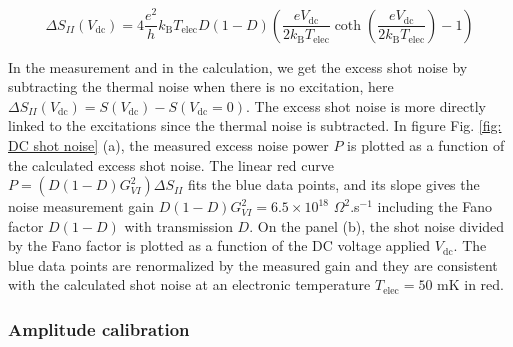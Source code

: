 \begin{equation}
\Delta S_{II}\left(V_{\mathrm{dc}}\right) = 4\frac{e^{2}}{h}k_{\mathrm{B}}T_{\mathrm{elec}}D(1-D)\left(\frac{eV_{\mathrm{dc}}}{2k_{\mathrm{B}}T_{\mathrm{elec}}}\coth\left(\frac{eV_{\mathrm{dc}}}{2k_{\mathrm{B}}T_{\mathrm{elec}}}\right)-1\right) \label{eq: DC excess shot noise}
\end{equation}

In the measurement and in the calculation, we get the excess shot noise by subtracting the thermal noise when there is no excitation, here $\Delta S_{II}\left(V_{\mathrm{dc}}\right) = S\left(V_{\mathrm{dc}}\right)-S\left(V_{\mathrm{dc}}=0\right)$.
The excess shot noise is more directly linked to the excitations since the thermal noise is subtracted.
In figure Fig. \ref{fig: DC shot noise} (a), the measured excess noise power $P$ is plotted as a function of the calculated excess shot noise.
The linear red curve $P = \left(D\left(1-D\right)G^{2}_{VI}\right) \Delta S_{II}$ fits the blue data points, and its slope gives the noise measurement gain $D\left(1-D\right)G^{2}_{VI} = 6.5\times 10^{18}$ $\Omega^{2}$.s$^{-1}$ including the Fano factor $D(1-D)$ with transmission $D$.
On the panel (b), the shot noise divided by the Fano factor is plotted as a function of the DC voltage applied $V_{\mathrm{dc}}$.
The blue data points are renormalized by the measured gain and they are consistent with the calculated shot noise at an electronic temperature $T_{\mathrm{elec}} = 50$ mK in red.

\subsubsection*{Amplitude calibration}

